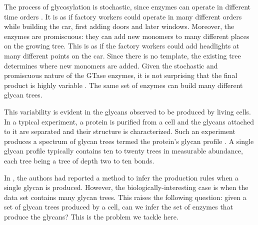 The process of glycosylation is stochastic, since enzymes can operate in different time orders \cite{Spahn2016}. It is as if factory workers could operate in many different orders while building the car, first adding doors and later windows. Moreover, the enzymes are promiscuous: they can add new monomers to many different places on the growing tree. This is as if the factory workers could add headlights at many different points on the car. Since there is no template, the existing tree determines where new monomers are added. Given the stochastic and promiscuous nature of the GTase enzymes, it is not surprising that the final product is highly variable \cite{Spahn2014}. The same set of enzymes can build many different glycan trees.

This variability is evident in the glycans observed to be produced by living cells. In a typical experiment, a protein is purified from a cell and the glycans attached to it are separated and their structure is characterized. Such an experiment produces a spectrum of glycan trees termed the protein's glycan profile \cite{Spahn2014}. A single glycan profile typically contains ten to twenty trees in measurable abundance, each tree being a tree of depth two to ten bonds. 

In \cite{Jaiman440792}, the authors had reported a method to infer the production rules when a single glycan is produced. However, the biologically-interesting case is when the data set contains many glycan trees. This raises the following question: given a set of glycan trees produced by a cell,
can we infer the set of enzymes that produce the glycans? This is the problem we tackle here.


